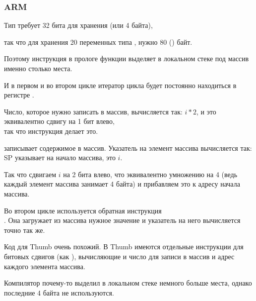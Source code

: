 \subsubsection{ARM}

\myparagraph{\NonOptimizingKeilVI (\ARMMode)}



Тип \Tint требует 32 бита для хранения (или 4 байта),

так что для хранения 20 переменных типа \Tint, нужно 80 () байт.

Поэтому инструкция  
в прологе функции выделяет в локальном стеке под массив именно столько места.

И в первом и во втором цикле итератор цикла  будет постоянно находиться в регистре .

Число, которое нужно записать в массив, вычисляется так: $i*2$, и это эквивалентно 
сдвигу на 1 бит влево,\\
так что инструкция  делает это.

 записывает содержимое  в массив.
Указатель на элемент массива вычисляется так: \ac{SP} указывает на начало массива,  это $i$.

Так что сдвигаем $i$ на 2 бита влево, что эквивалентно умножению на 4 
(ведь каждый элемент массива занимает 4 байта) и прибавляем это к адресу начала массива.

Во втором цикле используется обратная инструкция\\
.
Она загружает из массива нужное значение и указатель на него вычисляется точно так же.

\myparagraph{\OptimizingKeilVI (\ThumbMode)}



Код для Thumb очень похожий.
В Thumb имеются отдельные инструкции для битовых сдвигов (как ), 
вычисляющие и число для записи в массив и адрес каждого элемента массива.

Компилятор почему-то выделил в локальном стеке немного больше места, 
однако последние 4 байта не используются.




